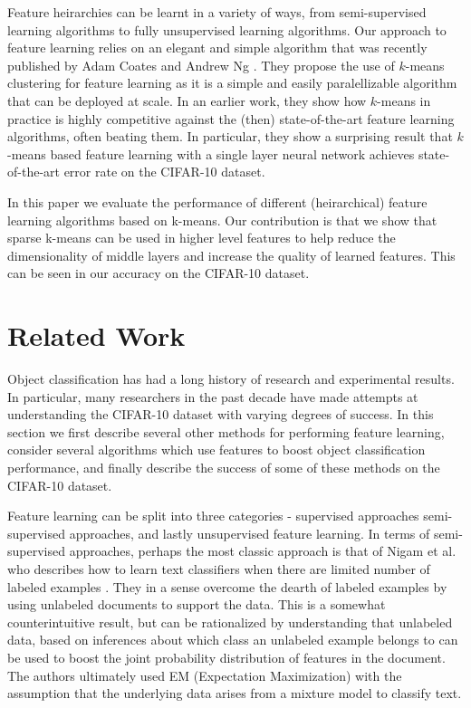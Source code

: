 \documentclass{article} %
\begin{document}
Feature heirarchies can be learnt in a variety of ways, from semi-supervised learning
algorithms to fully unsupervised learning algorithms.
Our approach to feature learning relies on an elegant and simple algorithm that was
recently published by Adam Coates and Andrew Ng \cite{coates11}. They propose the use
of $k$-means clustering for feature learning as it is a simple and easily paralellizable
algorithm that can be deployed at scale. In an earlier work, they show how $k$-means in
practice is highly competitive against the (then) state-of-the-art feature learning algorithms,
often beating them. In particular, they show a surprising result that
$k$-means based feature learning with a single layer neural network achieves state-of-the-art
error rate on the CIFAR-10 dataset.

In this paper we evaluate the performance of different (heirarchical) feature learning algorithms based on k-means. Our contribution is that we show that sparse k-means can be used in higher level features to help reduce the dimensionality of middle layers and increase the quality of learned features. This can be seen in our accuracy on the CIFAR-10 dataset.

\section{Related Work}

Object classification has had a long history of research and experimental results. In
particular, many researchers in the past decade have made attempts at understanding the
CIFAR-10 dataset with varying degrees of success. In this section we first describe
several other methods for performing feature learning, consider several algorithms which
use features to boost object classification performance, and finally describe the success
of some of these methods on the CIFAR-10 dataset.

Feature learning can be split into three categories - supervised approaches
semi-supervised approaches, and lastly unsupervised feature learning.
In terms of semi-supervised approaches, perhaps the most classic approach is that of
Nigam et al. who describes how to
learn text classifiers when there are limited number of labeled examples \cite{nigam}.
They in a sense
overcome the dearth of labeled examples by using unlabeled documents to support the data.
This is a somewhat counterintuitive result, but can be rationalized by understanding that
unlabeled data, based on inferences about which class an unlabeled example belongs to can
be used to boost the joint probability distribution of features in the document. The authors
ultimately used EM (Expectation Maximization) with the assumption that the underlying data
arises from a mixture model to classify text.
\end{document}
